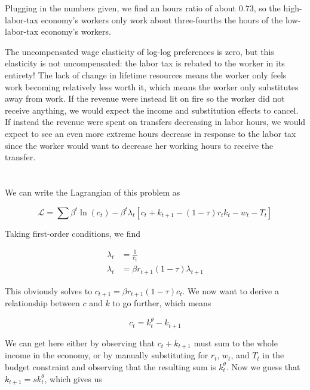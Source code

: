 \documentclass[12pt, letterpaper, parskip = full]{article}
\begin{document}
	Plugging in the numbers given, we find an hours ratio of about \(0.73\), so the high-labor-tax economy's workers only work about three-fourths the hours of the low-labor-tax economy's workers.

	The uncompensated wage elasticity of log-log preferences is zero, but this elasticity is not uncompensated: the labor tax is rebated to the worker in its entirety! The lack of change in lifetime resources means the worker only feels work becoming relatively less worth it, which means the worker only substitutes away from work. If the revenue were instead lit on fire so the worker did not receive anything, we would expect the income and substitution effects to cancel. If instead the revenue were spent on transfers decreasing in labor hours, we would expect to see an even more extreme hours decrease in response to the labor tax since the worker would want to decrease her working hours to receive the transfer.

	\section{}

	\subsection{}

	We can write the Lagrangian of this problem as

	\[ \mathcal{L} = \sum \beta^t \ln(c_t) - \beta^t \lambda_t \left[ c_t + k_{t+1} - (1 - \tau) r_t k_t - w_t - T_t \right]    \]
	
	Taking first-order conditions, we find 

	\begin{align*}
	\lambda_t &= \frac{1}{c_t} \\
	\lambda_t &= \beta r_{t+1} (1 - \tau) \lambda_{t+1}
	\end{align*}

	This obviously solves to \( c_{t+1} = \beta r_{t+1} (1 - \tau) c_t \). We now want to derive a relationship between \(c\) and \(k\) to go further, which means

	\[ c_t = k_t^\theta - k_{t+1}   \]

	We can get here either by observing that \(c_t + k_{t+1}\) must sum to the whole income in the economy, or by manually substituting for \(r_t\), \(w_t\), and \(T_t\) in the budget constraint and observing that the resulting sum is \(k_t^\theta\). Now we guess that \(k_{t+1} = s k_t^\theta\), which gives us
\end{document}
